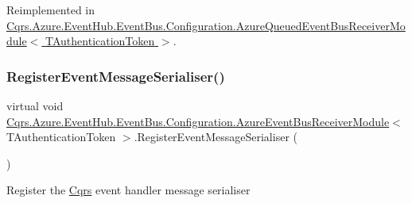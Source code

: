 Reimplemented in \hyperlink{classCqrs_1_1Azure_1_1EventHub_1_1EventBus_1_1Configuration_1_1AzureQueuedEventBusReceiverModule_a419dbe60e08be1bbf29b875cb1f121d0_a419dbe60e08be1bbf29b875cb1f121d0}{Cqrs.\+Azure.\+Event\+Hub.\+Event\+Bus.\+Configuration.\+Azure\+Queued\+Event\+Bus\+Receiver\+Module$<$ T\+Authentication\+Token $>$}.

\mbox{\label{classCqrs_1_1Azure_1_1EventHub_1_1EventBus_1_1Configuration_1_1AzureEventBusReceiverModule_aa66b1894a9647b338a0a3a809c5f270f_aa66b1894a9647b338a0a3a809c5f270f}} 
\subsubsection{\texorpdfstring{Register\+Event\+Message\+Serialiser()}{RegisterEventMessageSerialiser()}}
{\footnotesize\ttfamily virtual void \hyperlink{classCqrs_1_1Azure_1_1EventHub_1_1EventBus_1_1Configuration_1_1AzureEventBusReceiverModule}{Cqrs.\+Azure.\+Event\+Hub.\+Event\+Bus.\+Configuration.\+Azure\+Event\+Bus\+Receiver\+Module}$<$ T\+Authentication\+Token $>$.Register\+Event\+Message\+Serialiser (\begin{DoxyParamCaption}{ }\end{DoxyParamCaption})\hspace{0.3cm}{\ttfamily [virtual]}}



Register the \hyperlink{namespaceCqrs}{Cqrs} event handler message serialiser 


